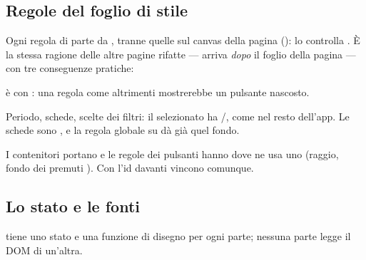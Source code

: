 \subsection{Regole del foglio di stile}

Ogni regola di  parte da , tranne quelle sul
canvas della pagina (): lo controlla
. È la stessa ragione delle altre pagine rifatte ---
 arriva \emph{dopo} il foglio della pagina --- con tre
conseguenze pratiche:

\begin{description}[leftmargin = 1.4em, style = nextline, itemsep = 4pt]
  \item[\cod{[hidden]}]  è  con
    : una regola come 
    altrimenti mostrerebbe un pulsante nascosto.
  \item[Selezione unica a contrasto pieno] Periodo, schede, scelte dei filtri:
    il selezionato ha /, come nel resto
    dell'app. Le schede sono , e la regola globale su
    \cod{[aria-selected="true"]} dà già quel fondo.
  \item[Pulsanti] I contenitori portano  e le
    regole dei pulsanti hanno  dove  ne
    usa uno (raggio, fondo dei premuti ). Con l'id davanti
    vincono comunque.
\end{description}

\filbreak
\subsection{Lo stato e le fonti}

 tiene uno stato  e una funzione di disegno per ogni
parte; nessuna parte legge il DOM di un'altra.

